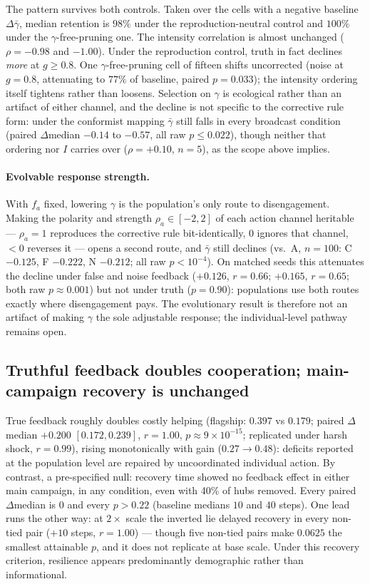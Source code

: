 \documentclass{svproc}
\begin{document}
The pattern survives both controls. Taken over the cells with a negative
baseline $\Delta\bar\gamma$, median retention is $98\%$ under the
reproduction-neutral control and $100\%$ under the $\gamma$-free-pruning one. The intensity
correlation is almost unchanged ($\rho=-0.98$ and $-1.00$). Under the
reproduction control, truth in fact declines \emph{more} at $g\geq0.8$. One $\gamma$-free-pruning cell of fifteen shifts uncorrected (noise at
$g=0.8$, attenuating to $77\%$ of baseline, paired $p=0.033$); the intensity
ordering itself tightens rather than loosens. Selection on $\gamma$ is
ecological rather than an artifact of either channel, and the decline is not
specific to the corrective rule form: under the conformist mapping $\bar\gamma$ still falls in every
broadcast condition (paired $\Delta$median $-0.14$ to $-0.57$, all
raw $p\leq0.022$), though neither that ordering nor $I$ carries over
($\rho=+0.10$, $n=5$), as the scope above implies.

\paragraph{Evolvable response strength.} With $f_a$ fixed, lowering $\gamma$ is
the population's only route to disengagement. Making the polarity and strength
$\rho_a\in[-2,2]$ of each action channel heritable --- $\rho_a=1$ reproduces the
corrective rule bit-identically, $0$ ignores that channel, ${<}0$ reverses
it --- opens a second route, and $\bar\gamma$ still declines (vs.\ A, $n=100$:
C $-0.125$, F $-0.222$, N $-0.212$; all raw $p<10^{-4}$). On matched seeds
this attenuates the decline under false and noise feedback ($+0.126$,
$r=0.66$; $+0.165$, $r=0.65$; both raw $p\approx0.001$) but not under truth
($p=0.90$): populations use both routes exactly where disengagement pays. The
evolutionary result is therefore not an artifact of making $\gamma$ the sole
adjustable response; the individual-level pathway remains open.

\subsection{Truthful feedback doubles cooperation; main-campaign recovery is unchanged}
True feedback roughly doubles costly helping (flagship: $0.397$ vs $0.179$;
paired $\Delta$median $+0.200$ $[0.172,0.239]$, $r=1.00$,
$p\!\approx\!9\times10^{-15}$; replicated under harsh shock, $r=0.99$),
rising monotonically with gain ($0.27\!\to\!0.48$): deficits reported at the
population level are repaired by uncoordinated individual action. By
contrast, a pre-specified null: recovery time showed no feedback effect in
either main campaign, in any condition, even with 40\% of hubs removed. Every
paired $\Delta$median is $0$ and every $p>0.22$ (baseline medians $10$ and
$40$ steps). One lead
runs the other way: at $2\times$ scale the inverted lie delayed recovery in
every non-tied pair ($+10$ steps, $r=1.00$) --- though five non-tied pairs
make $0.0625$ the smallest attainable $p$, and it does not replicate at base
scale.
Under this recovery criterion, resilience appears predominantly demographic
rather than informational.
\end{document}
